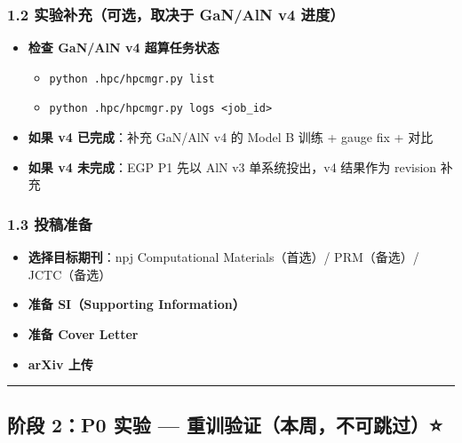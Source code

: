 \documentclass[
  12pt,
]{ctexart}
\providecommand{\tightlist}{%
  \setlength{\itemsep}{0pt}\setlength{\parskip}{0pt}}
\begin{document}
\subsubsection{1.2 实验补充（可选，取决于 GaN/AlN v4
进度）}\label{ux5b9eux9a8cux8865ux5145ux53efux9009ux53d6ux51b3ux4e8e-ganaln-v4-ux8fdbux5ea6}

\begin{itemize}
\tightlist
\item[$\square$]
  \textbf{检查 GaN/AlN v4 超算任务状态}

  \begin{itemize}
  \tightlist
  \item
    \texttt{python\ .hpc/hpcmgr.py\ list}
  \item
    \texttt{python\ .hpc/hpcmgr.py\ logs\ \textless{}job\_id\textgreater{}}
  \end{itemize}
\item[$\square$]
  \textbf{如果 v4 已完成}：补充 GaN/AlN v4 的 Model B 训练 + gauge fix +
  对比
\item[$\square$]
  \textbf{如果 v4 未完成}：EGP P1 先以 AlN v3 单系统投出，v4 结果作为
  revision 补充
\end{itemize}

\subsubsection{1.3 投稿准备}\label{ux6295ux7a3fux51c6ux5907}

\begin{itemize}
\tightlist
\item[$\square$]
  \textbf{选择目标期刊}：npj Computational Materials（首选）/
  PRM（备选）/ JCTC（备选）
\item[$\square$]
  \textbf{准备 SI（Supporting Information）}
\item[$\square$]
  \textbf{准备 Cover Letter}
\item[$\square$]
  \textbf{arXiv 上传}
\end{itemize}

\begin{center}\rule{0.5\linewidth}{0.5pt}\end{center}

\subsection{阶段 2：P0 实验 ---
重训验证（本周，不可跳过）⭐}\label{ux9636ux6bb5-2p0-ux5b9eux9a8c-ux91cdux8badux9a8cux8bc1ux672cux5468ux4e0dux53efux8df3ux8fc7}
\end{document}
